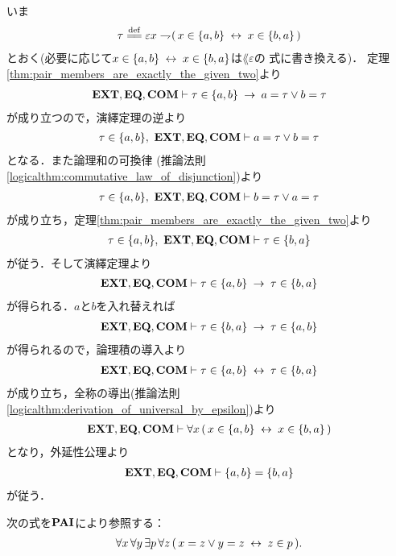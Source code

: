 	\begin{sketch}
		いま
		\begin{align}
			\tau \defeq \varepsilon x \negation (\, x \in \{a,b\} \lrarrow x \in \{b,a\}\, )
		\end{align}
		とおく(必要に応じて$x \in \{a,b\} \hspace{0.25em}\leftrightarrow\hspace{0.25em} x \in \{b,a\}$は$\lang{\varepsilon}$の
		式に書き換える)．
		定理\ref{thm:pair_members_are_exactly_the_given_two}より
		\begin{align}
			\mbox{{\bf EXT}},\mbox{{\bf EQ}},\mbox{\bf COM} \vdash
			\tau \in \{a,b\} \hspace{0.25em}\rightarrow\hspace{0.25em} a = \tau \vee b = \tau
		\end{align}
		が成り立つので，演繹定理の逆より
		\begin{align}
			\tau \in \{a,b\},\ \mbox{{\bf EXT}},\mbox{{\bf EQ}},\mbox{\bf COM} \vdash a = \tau \vee b = \tau
		\end{align}
		となる．また論理和の可換律
		(推論法則\ref{logicalthm:commutative_law_of_disjunction})より
		\begin{align}
			\tau \in \{a,b\},\ \mbox{{\bf EXT}},\mbox{{\bf EQ}},\mbox{\bf COM} \vdash b = \tau \vee a = \tau
		\end{align}
		が成り立ち，定理\ref{thm:pair_members_are_exactly_the_given_two}より
		\begin{align}
			\tau \in \{a,b\},\ \mbox{{\bf EXT}},\mbox{{\bf EQ}},\mbox{\bf COM} \vdash \tau \in \{b,a\}
		\end{align}
		が従う．そして演繹定理より
		\begin{align}
			\mbox{{\bf EXT}},\mbox{{\bf EQ}},\mbox{\bf COM} \vdash \tau \in \{a,b\} \hspace{0.25em}\rightarrow\hspace{0.25em} \tau \in \{b,a\}
		\end{align}
		が得られる．$a$と$b$を入れ替えれば
		\begin{align}
			\mbox{{\bf EXT}},\mbox{{\bf EQ}},\mbox{\bf COM} \vdash \tau \in \{b,a\} \hspace{0.25em}\rightarrow\hspace{0.25em} \tau \in \{a,b\}
		\end{align}
		が得られるので，論理積の導入より
		\begin{align}
			\mbox{{\bf EXT}},\mbox{{\bf EQ}},\mbox{\bf COM} \vdash \tau \in \{a,b\} \hspace{0.25em}\leftrightarrow\hspace{0.25em} \tau \in \{b,a\}
		\end{align}
		が成り立ち，全称の導出(推論法則\ref{logicalthm:derivation_of_universal_by_epsilon})より
		\begin{align}
			\mbox{{\bf EXT}},\mbox{{\bf EQ}},\mbox{\bf COM} \vdash \forall x\, (\, x \in \{a,b\} \hspace{0.25em}\leftrightarrow\hspace{0.25em} x \in \{b,a\}\, )
		\end{align}
		となり，外延性公理より
		\begin{align}
			\mbox{{\bf EXT}},\mbox{{\bf EQ}},\mbox{\bf COM} \vdash \{a,b\} = \{b,a\}
		\end{align}
		が従う．
		\QED
	\end{sketch}
		
	\begin{screen}
		\begin{axm}[対の公理] 次の式を$\mbox{{\bf PAI}}$により参照する：
			\begin{align}
				\forall x\, \forall y\, \exists p\, \forall z\, 
				(\, x = z \vee y = z \hspace{0.25em}\leftrightarrow\hspace{0.25em} z \in p\, ).
			\end{align}
		\end{axm}
	\end{screen}
	
